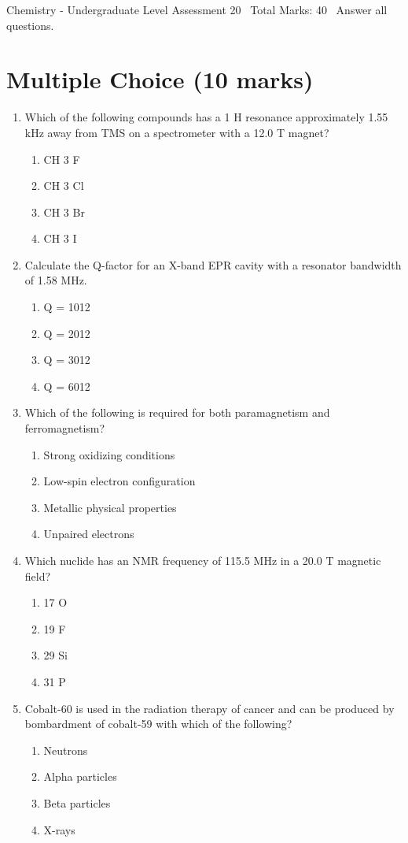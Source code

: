 \documentclass[12pt]{article}
\begin{document}
\begin{center}
Chemistry - Undergraduate Level Assessment 20 \
Total Marks: 40 \
Answer all questions.
\end{center}

\section*{Multiple Choice (10 marks)}
\begin{enumerate}[label=\arabic*.]
\item Which of the following compounds has a 1 H resonance approximately 1.55 kHz away from TMS on a spectrometer with a 12.0 T magnet?
\begin{enumerate}[label=(\alph*)]
    \item CH 3 F
    \item CH 3 Cl
    \item CH 3 Br
    \item CH 3 I
\end{enumerate}
\item Calculate the Q-factor for an X-band EPR cavity with a resonator bandwidth of 1.58 MHz.
\begin{enumerate}[label=(\alph*)]
    \item Q = 1012
    \item Q = 2012
    \item Q = 3012
    \item Q = 6012
\end{enumerate}
\item Which of the following is required for both paramagnetism and ferromagnetism?
\begin{enumerate}[label=(\alph*)]
    \item Strong oxidizing conditions
    \item Low-spin electron configuration
    \item Metallic physical properties
    \item Unpaired electrons
\end{enumerate}
\item Which nuclide has an NMR frequency of 115.5 MHz in a 20.0 T magnetic field?
\begin{enumerate}[label=(\alph*)]
    \item 17 O
    \item 19 F
    \item 29 Si
    \item 31 P
\end{enumerate}
\item Cobalt-60 is used in the radiation therapy of cancer and can be produced by bombardment of cobalt-59 with which of the following?
\begin{enumerate}[label=(\alph*)]
    \item Neutrons
    \item Alpha particles
    \item Beta particles
    \item X-rays
\end{enumerate}
\end{enumerate}
\end{document}
